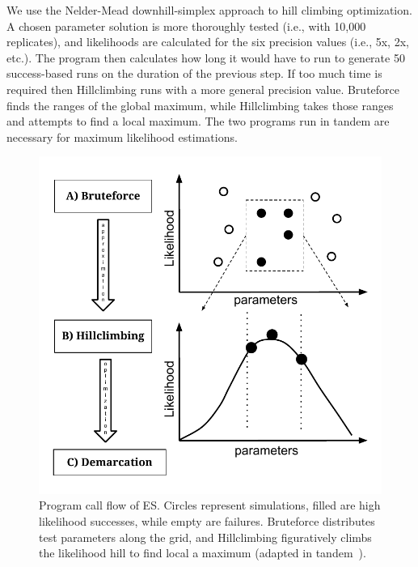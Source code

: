 We use the Nelder-Mead downhill-simplex approach to hill climbing optimization.
A chosen parameter solution is more thoroughly tested (i.e., with 10,000 replicates), and likelihoods are calculated for the six precision values (i.e., 5x, 2x, etc.).
The program then calculates how long it would have to run to generate 50 success-based runs on the duration of the previous step.
If too much time is required then Hillclimbing runs with a more general precision value.
Bruteforce finds the ranges of the global maximum, while Hillclimbing takes those ranges and attempts to find a local maximum.
The two programs run in tandem are necessary for maximum likelihood estimations.


\begin{figure}[h!]
 \centering
 \includegraphics[scale=0.75]{images/ESFlow-CH2.pdf}
 \caption[Ecotype Simulation program flow diagram.]{Program call flow of ES. Circles represent simulations, filled are high likelihood successes, while empty are failures. Bruteforce distributes test parameters along the grid, and Hillclimbing figuratively climbs the likelihood hill to find local a maximum (adapted in tandem~\protect\cite{lingThesis}).}
 \label{fig:Flow}
\end{figure}

